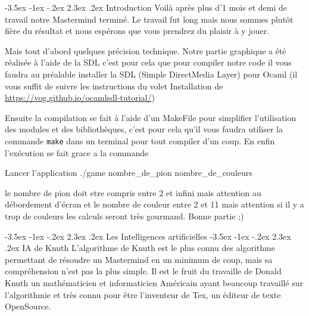 \documentclass[11pt, a4paper]{article}
\makeatletter
\renewcommand{\section}{\@startsection{section}{1}{\z@}%
          {-3.5ex \@plus -1ex \@minus -.2ex}%
          {2.3ex \@plus .2ex}%
          {\reset@font\Large\bfseries	}}
\renewcommand{\subsection}{\@startsection{subsection}{1}{\z@}%
          {-3.5ex \@plus -1ex \@minus -.2ex}%
          {2.3ex \@plus .2ex}%
          {\reset@font\large\bfseries}}
\makeatother
\begin{document}
\section{Introduction} 
Voilà après plus d’1 mois et demi de travail notre Mastermind terminé. 
Le travail fut long mais nous sommes plutôt fière du résultat et nous espérons que vous prendrez du plaisir à y jouer.

\vspace{3  mm}


Mais tout d’abord quelques précision technique. 
Notre partie graphique a été réalisée à l’aide de la SDL c’est pour cela que pour compiler notre code
 il vous faudra au préalable installer la SDL (Simple DirectMedia Layer) pour Ocaml (il vous suffit de suivre
  les instructions du volet Installation de \url{https://vog.github.io/ocamlsdl-tutorial/})

  \vspace{3  mm}


Ensuite la compilation se fait à l’aide d’un MakeFile pour simplifier l’utilisation des modules et des bibliothèques, 
c’est pour cela qu’il vous faudra utiliser la commande \texttt{make} dans un terminal pour tout compiler d’un coup. En enfin l’exécution se fait grace a la commande\\

\begin{bashCode}{Lancer l'application} 
./game nombre_de_pion nombre_de_couleurs
\end{bashCode} 


le nombre de pion doit etre compris entre 2 et infini mais attention au débordement d’écran et le nombre de couleur entre 2 et 11 mais attention si il y a trop de couleurs 
les calculs seront très gourmand. Bonne partie ;)

\section{Les Intelligences artificielles} 
\subsection{IA de Knuth}
L’algorithme de Knuth est le plus connu des algorithme permettant de résoudre un Mastermind en un minimum de coup, 
mais sa compréhension n’est pas la plus simple. Il est le fruit du travaille de Donald Knuth un mathématicien et informaticien Américain
 ayant beaucoup travaillé sur l’algorithmie et très connu pour être l’inventeur de Tex, un éditeur de texte OpenSource. 
\end{document}
